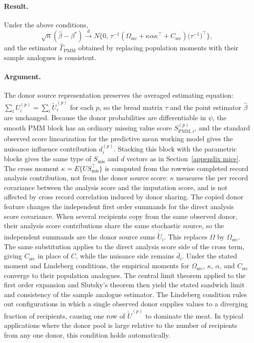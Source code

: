 \paragraph{Result.}
Under the above conditions,
\[
\sqrt n(\hat\beta-\beta^\ast)
\xrightarrow{d}
N\bigl\{0,\,
\tau^{-1}(\Omega_{\mathrm{src}}+\kappa\alpha\kappa^\top+C_{\mathrm{src}})
\bigl(\tau^{-1}\bigr)^{\top}
\bigr\},
\]
and the estimator \(\widehat\Gamma_{\mathrm{PMM}}\) obtained by
replacing population moments with their sample analogues is consistent.
\paragraph{Argument.}
The donor source representation preserves the averaged estimating
equation: \(\sum_iU_i^{(p)}=\sum_i\widetilde U_i^{(p)}\) for each
\(p\), so the bread matrix \(\tau\) and the point estimator \(\hat\beta\)
are unchanged.
Because the donor probabilities are differentiable in \(\psi\), the
smooth PMM block has an ordinary missing value score
\(S_{\mathrm{PMM},i}^{(p)}\), and the standard observed score
linearization for the predictive mean working model gives the nuisance
influence contribution \(d_i^{(p)}\).  Stacking this block with the
parametric blocks gives the same type of \(S_{\mathrm{mis}}\) and \(d\)
vectors as in Section~\ref{appendix mice}.  The cross moment
\(\kappa=E\{US_{\mathrm{mis}}^\top\}\) is computed from the rowwise
completed record analysis contribution, not from the donor source score:
\(\kappa\) measures the per record covariance between the analysis score
and the imputation score, and is not affected by cross record correlation
induced by donor sharing.
The copied donor feature changes the independent first order summands
for the direct analysis score covariance.  When several recipients copy
from the same observed donor, their analysis score contributions share
the same stochastic source, so the independent summands are the
donor source sums \(\bar{\widetilde U}_i\).  This replaces \(\Omega\) by
\(\Omega_{\mathrm{src}}\).  The same substitution applies to the
direct analysis score side of the cross term, giving \(C_{\mathrm{src}}\)
in place of \(C\), while the nuisance side remains \(\bar d_i\).
Under the stated moment and Lindeberg conditions, the empirical moments
for \(\Omega_{\mathrm{src}}\), \(\kappa\), \(\alpha\), and
\(C_{\mathrm{src}}\) converge to their population analogues.  The
central limit theorem applied to the first order expansion and
Slutsky's theorem then yield the stated sandwich limit and consistency
of the sample analogue estimator.
The Lindeberg condition rules out configurations in which a single
observed donor supplies values to a diverging fraction of recipients,
causing one row of \(\widetilde U^{(p)}\) to dominate the meat.  In
typical applications where the donor pool is large relative to the
number of recipients from any one donor, this condition holds
automatically.